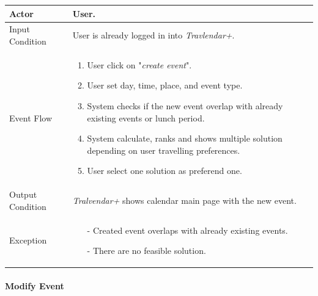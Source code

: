 		\begin{tabular}{| l | p{} | }
			\hline
			\hline
			Actor	&		User. \\
			\hline
			Input Condition		&		User is already logged in into \textit{Travlendar+}. \\
			\hline
			Event Flow		&		\begin{enumerate}
												\item User click on "\textit{create event}".
												\item User set day, time, place, and event type.
												\item System checks if the new event overlap with already existing events or lunch period.
												\item	 System calculate, ranks and shows multiple solution depending on user travelling preferences.
												\item User select one solution as preferend one.
											\end{enumerate} \\
			\hline
			Output Condition		&		\textit{Tralvendar+} shows calendar main page with the new event. \\
			\hline		
			Exception		&		\begin{itemize}
											\item[-] Created event overlaps with already existing events.
											\item[-] There are no feasible solution.
										\end{itemize} \\
			\hline
			\hline
		\end{tabular}



	\paragraph{Modify Event}
	
